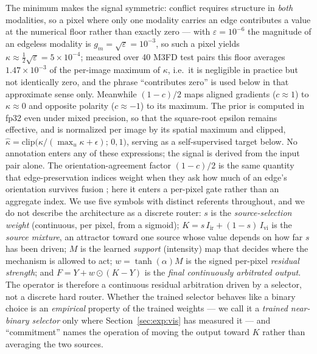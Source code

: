 \documentclass[pdflatex,sn-mathphys-num]{sn-jnl}
\theoremstyle{thmstyleone}%
\theoremstyle{thmstyletwo}%
\theoremstyle{thmstylethree}%
\begin{document}
The minimum makes the signal symmetric: conflict requires structure in \emph{both} modalities, so a pixel where only one modality carries an edge contributes a value at the numerical floor rather than exactly zero --- with $\varepsilon = 10^{-6}$ the magnitude of an edgeless modality is $g_m = \sqrt{\varepsilon} = 10^{-3}$, so such a pixel yields $\kappa \approx \tfrac{1}{2}\sqrt{\varepsilon} = 5\times10^{-4}$; measured over 40 M3FD test pairs this floor averages $1.47\times10^{-3}$ of the per-image maximum of $\kappa$, i.e.\ it is negligible in practice but not identically zero, and the phrase ``contributes zero'' is used below in that approximate sense only. Meanwhile $(1-c)/2$ maps aligned gradients ($c \approx 1$) to $\kappa \approx 0$ and opposite polarity ($c \approx -1$) to its maximum. The prior is computed in fp32 even under mixed precision, so that the square-root epsilon remains effective, and is normalized per image by its spatial maximum and clipped, $\hat\kappa = \mathrm{clip}\big(\kappa / (\max_u \kappa + \epsilon);\, 0, 1\big)$, serving as a self-supervised target below. No annotation enters any of these expressions; the signal is derived from the input pair alone. The orientation-agreement factor $(1-c)/2$ is the same quantity that edge-preservation indices weight when they ask how much of an edge's orientation survives fusion \cite{xydeas2000objective}; here it enters a per-pixel gate rather than an aggregate index. We use five symbols with distinct referents throughout, and we do not describe the architecture as a discrete router: $s$ is the \emph{source-selection weight} (continuous, per pixel, from a sigmoid); $K = s\,I_{\mathrm{ir}}+(1-s)\,I_{\mathrm{vi}}$ is the \emph{source mixture}, an attractor toward one source whose value depends on how far $s$ has been driven; $M$ is the learned \emph{support} (intensity) map that decides where the mechanism is allowed to act; $w = \tanh(\alpha)M$ is the signed per-pixel \emph{residual strength}; and $F = Y + w\odot(K-Y)$ is the \emph{final continuously arbitrated output}. The operator is therefore a continuous residual arbitration driven by a selector, not a discrete hard router. Whether the trained selector behaves like a binary choice is an \emph{empirical} property of the trained weights --- we call it a \emph{trained near-binary selector} only where Section~\ref{sec:exp:vis} has measured it --- and ``commitment'' names the operation of moving the output toward $K$ rather than averaging the two sources.
\end{document}
